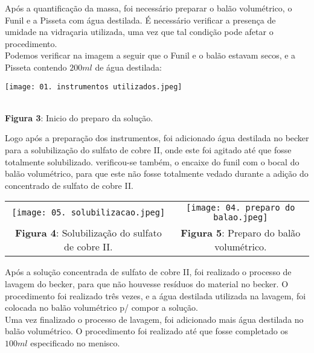 \documentclass[a4paper, 11pt]{article}
\begin{document}
    \indent Após a quantificação da massa, foi necessário preparar o balão volumétrico, o Funil e a Pisseta com água destilada\@.
    É necessário verificar a presença de umidade na vidraçaria utilizada, uma vez que tal condição pode afetar o procedimento\@.\\
    Podemos verificar na imagem a seguir que o Funil e o balão estavam secos, e a Pisseta contendo $200ml$ de água destilada\@:

    \begin{center}
        \parbox{7cm}{\texttt{[image: 01. instrumentos utilizados.jpeg]}}\\
        \singlespacing
        \textbf{Figura 3}: Inicio do preparo da solução\@.
    \end{center}
    \doublespacing

    \indent Logo após a preparação dos instrumentos, foi adicionado água destilada no becker para a solubilização do sulfato de cobre II,
    onde este foi agitado até que fosse totalmente solubilizado\@.
    verificou-se também, o encaixe do funil com o bocal do balão volumétrico, para que este não fosse totalmente vedado durante a
    adição do concentrado de sulfato de cobre II\@.\\

    \begin{center}
        \begin{tabular}{c c}
            \parbox{7cm}{\texttt{[image: 05. solubilizacao.jpeg]}}
            & \parbox{7cm}{\texttt{[image: 04. preparo do balao.jpeg]}}
            \\
            \textbf{Figura 4}: Solubilização do sulfato de cobre II\@.
            & \textbf{Figura 5}: Preparo do balão volumétrico\@.
        \end{tabular}
    \end{center}

    \doublespacing

    \indent Após a solução concentrada de sulfato de cobre II, foi realizado o processo de lavagem do becker, para
    que não houvesse resíduos do material no becker\@. O procedimento foi realizado três vezes, e a água destilada
    utilizada na lavagem, foi colocada no balão volumétrico p/ compor a solução\@.\\
    \indent Uma vez finalizado o processo de lavagem, foi adicionado mais água destilada no balão volumétrico\@.
    O procedimento foi realizado até que fosse completado os $100ml$ especificado no menisco\@.\\
\end{document}
